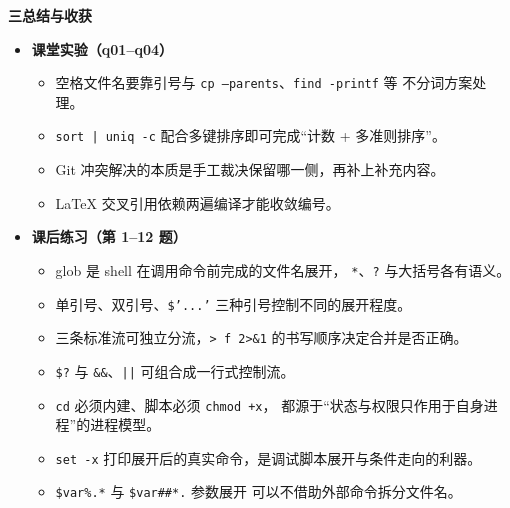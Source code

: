\documentclass[11pt,a4paper,fontset=none]{ctexart}
\newcommand{\partbanner}[3]{%
  \par\vspace{1.6em}
  \begin{tcolorbox}[enhanced, colback=#1!10, colframe=#1!85!black,
    boxrule=1pt, arc=3pt, left=8pt, right=8pt, top=6pt, bottom=6pt,
    before skip=1.6em]
    {\Large\bfseries\color{#1!70!black}#2\qquad #3}
  \end{tcolorbox}
  \par\vspace{0.2em}\noindent\ignorespaces
}
\begin{document}
\partbanner{expone}{三}{总结与收获}
\begin{itemize}[leftmargin=1.4em, itemsep=2pt]
  \item \textbf{课堂实验（q01--q04）}
  \begin{itemize}[leftmargin=1.6em, itemsep=1pt]
    \item 空格文件名要靠引号与 \texttt{cp --parents}、\texttt{find -printf} 等
          不分词方案处理。
    \item \texttt{sort | uniq -c} 配合多键排序即可完成“计数 + 多准则排序”。
    \item Git 冲突解决的本质是手工裁决保留哪一侧，再补上补充内容。
    \item LaTeX 交叉引用依赖两遍编译才能收敛编号。
  \end{itemize}
  \item \textbf{课后练习（第 1--12 题）}
  \begin{itemize}[leftmargin=1.6em, itemsep=1pt]
    \item glob 是 shell 在调用命令前完成的文件名展开，
          \texttt{*}、\texttt{?} 与大括号各有语义。
    \item 单引号、双引号、\texttt{\$'...'} 三种引号控制不同的展开程度。
    \item 三条标准流可独立分流，\texttt{> f 2>\&1} 的书写顺序决定合并是否正确。
    \item \texttt{\$?} 与 \texttt{\&\&}、\texttt{||} 可组合成一行式控制流。
    \item \texttt{cd} 必须内建、脚本必须 \texttt{chmod +x}，
          都源于“状态与权限只作用于自身进程”的进程模型。
    \item \texttt{set -x} 打印展开后的真实命令，是调试脚本展开与条件走向的利器。
    \item \texttt{\${var\%.*}} 与 \texttt{\${var\#\#*.}} 参数展开
          可以不借助外部命令拆分文件名。
  \end{itemize}
\end{itemize}
\end{document}
